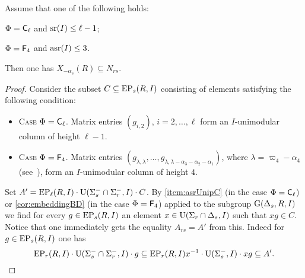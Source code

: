 \begin{lemma}\label{lemma:DVST}
Assume that one of the following holds:
\begin{lemlist}
 \item \label{lemma:DVcaseCl} $\Phi=\mathsf{C}_\ell$ and $\operatorname{sr}(I) \leq \ell-1$;
 \item \label{lemma:DVcaseF4} $\Phi=\mathsf{F}_4$ and $\operatorname{asr}(I) \leq 3$.
\end{lemlist}
Then one has $X_{-\alpha_s}(R) \subseteq N_{rs}$.
\end{lemma}
\begin{proof}
Consider the subset $C \subseteq \operatorname{EP}_s(R, I)$ consisting of elements satisfying the following condition:
\begin{itemize}
 \item \textsc{Case $\Phi=\mathsf{C}_\ell$.} Matrix entries $(g_{i,2})$, $i=2,\ldots, \ell$ form an $I$-unimodular column of height $\ell-1$.
 \item \textsc{Case $\Phi=\mathsf{F}_4$.} Matrix entries $(g_{\lambda, \lambda}, \ldots, g_{\lambda, \lambda - \alpha_3 - \alpha_2 - \alpha_1})$, where $\lambda = \varpi_4 - \alpha_4$ (see~\cite[Fig.~26]{PSV98}),
                                     form an $I$-unimodular column of height $4$. \end{itemize}

Set $A' = \operatorname{EP}_\ell(R, I) \cdot \operatorname{U}(\Sigma_s^- \cap \Sigma_r^-, I) \cdot C$.
By \cref{item:asrUnipC} (in the case $\Phi=\mathsf{C}_\ell$) or \cref{cor:embeddingBD} (in the case $\Phi=\mathsf{F}_4$) applied to the subgroup $\operatorname{G}(\Delta_s, R, I)$ 
we find for every $g \in \operatorname{EP}_s(R, I)$ an element $x \in \operatorname{U}(\Sigma_r \cap \Delta_s, I)$ such that $xg \in C$.  
Notice that one immediately gets the equality $A_{rs} = A'$ from this.
Indeed for $g\in \operatorname{EP}_s(R, I)$ one has
\begin{equation*} \operatorname{EP}_r(R, I) \cdot \operatorname{U}(\Sigma_s^- \cap \Sigma_r^-, I) \cdot g \subseteq 
 \operatorname{EP}_r(R, I)x^{-1}  \cdot \operatorname{U}(\Sigma_s^-, I) \cdot xg \subseteq A'. \end{equation*}


\end{proof}
